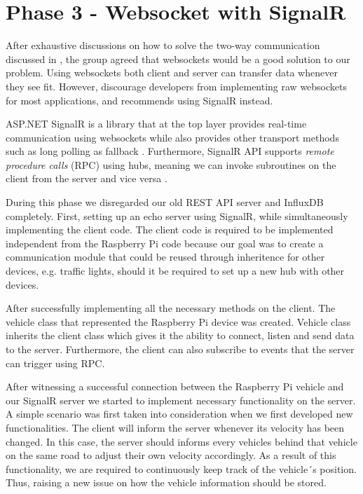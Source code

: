 \section{Phase 3 - Websocket with SignalR}\label{phase3}
After exhaustive discussions on how to solve the two-way communication discussed in , the group agreed that websockets would be a good solution to our problem. Using websockets both client and server can transfer data whenever they see fit. However, \cite{microsoft_websockets} discourage developers from implementing raw websockets for most applications, and recommends using SignalR instead.

ASP.NET SignalR is a library that at the top layer provides real-time communication using websockets while also provides other transport methods such as long polling as fallback \parencite{microsoft_signalr}. Furthermore, SignalR API supports \emph{remote procedure calls} (RPC) using hubs, meaning we can invoke subroutines on the client from the server and vice versa \parencite{microsoft_signalr}.

During this phase we disregarded our old REST API server and InfluxDB completely. First, setting up an echo server using SignalR, while simultaneously implementing the client code. The client code is required to be implemented independent from the Raspberry Pi code because our goal was to create a communication module that could be reused through inheritence for other devices, e.g. traffic lights, should it be required to set up a new hub with other devices.

After successfully implementing all the necessary methods on the client. The vehicle class that represented the Raspberry Pi device was created. Vehicle class inherits the client class which gives it the ability to connect, listen and send data to the server. Furthermore, the client can also subscribe to events that the server can trigger using RPC.

After witnessing a successful connection between the Raspberry Pi vehicle and our SignalR server we started to implement necessary functionality on the server. A simple scenario was first taken into consideration when we first developed new functionalities. The client will inform the server whenever its velocity has been changed. In this case, the server should informs every vehicles behind that vehicle on the same road to adjust their own velocity accordingly. As a result of this functionality, we are required to continuously keep track of the vehicle´s position. Thus, raising a new issue on how the vehicle information should be stored.

